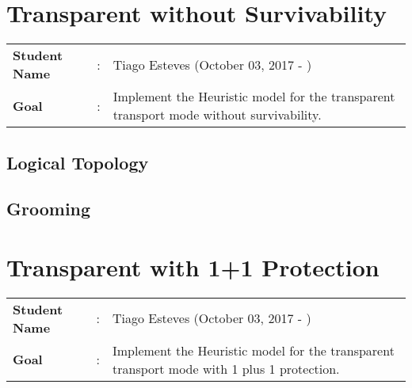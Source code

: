 \clearpage

\section{Transparent without Survivability}
\begin{tcolorbox}	
\begin{tabular}{p{2.75cm} p{0.2cm} p{10.5cm}} 	
\textbf{Student Name}  &:& Tiago Esteves    (October 03, 2017 - )\\
\textbf{Goal}          &:& Implement the Heuristic model for the transparent transport mode without survivability.
\end{tabular}
\end{tcolorbox}

\subsection{Logical Topology}

\subsection{Grooming}


\newpage
\section{Transparent with 1+1 Protection}
\begin{tcolorbox}	
\begin{tabular}{p{2.75cm} p{0.2cm} p{10.5cm}} 	
\textbf{Student Name}  &:& Tiago Esteves    (October 03, 2017 - )\\
\textbf{Goal}          &:& Implement the Heuristic model for the transparent transport mode with 1 plus 1 protection.
\end{tabular}
\end{tcolorbox}
